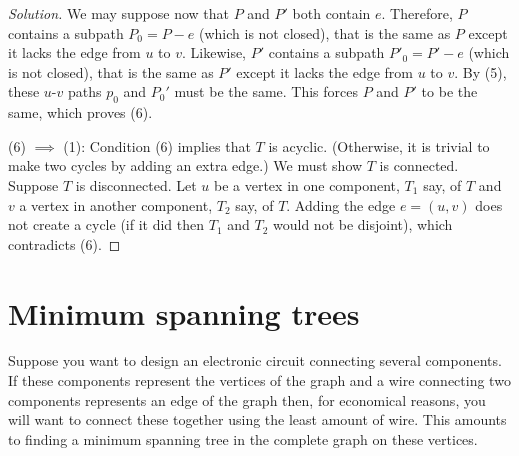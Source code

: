 \begin{proof}[Solution]
We may suppose now that $P$ and $P'$ both contain $e$.
Therefore, $P$ contains a subpath $P_0=P-e$ (which is not
closed), that is the same as $P$ except it lacks the edge
from $u$ to $v$. Likewise, $P'$ contains a subpath $P'_0=P'-e$ (which is not
closed), that is the same as $P'$ except it lacks the edge
from $u$ to $v$. By (5), these $u$-$v$ paths
$p_0$ and $P_0'$ must be the same. This forces
$P$ and $P'$ to be the same, which proves (6).


\noindent
(6) $\implies$ (1):
Condition (6) implies that $T$ is acyclic. (Otherwise, it is trivial
to make two cycles by adding an extra edge.) We must show $T$ is connected.
Suppose $T$ is disconnected. Let $u$ be a vertex in one component,
$T_1$ say,
of $T$ and $v$ a vertex in another component, $T_2$ say, of $T$.
Adding the edge $e=(u,v)$ does not create a cycle (if it did
then $T_1$ and $T_2$ would not be disjoint), which contradicts (6).
\end{proof}



\section{Minimum spanning trees}

Suppose you want to design an electronic circuit
connecting several components. If these components represent the
vertices of the graph and a wire connecting two components
represents an edge of the graph then, for economical reasons, you will want to
connect these together using the least amount of wire.
This amounts to finding a minimum spanning tree in the
complete graph on these vertices.

